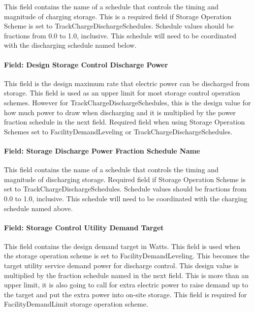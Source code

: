 This field contains the name of a schedule that controls the timing and magnitude of charging storage. This is a required field if Storage Operation Scheme is set to TrackChargeDischargeSchedules. Schedule values should be fractions from 0.0 to 1.0, inclusive. This schedule will need to be coordinated with the discharging schedule named below.

\paragraph{Field: Design Storage Control Discharge Power}\label{field-design-storage-control-discharge-power}

This field is the design maximum rate that electric power can be discharged from storage. This field is used as an upper limit for most storage control operation schemes. However for TrackChargeDischargeSchedules, this is the design value for how much power to draw when discharging and it is multiplied by the power fraction schedule in the next field. Required field when using Storage Operation Schemes set to FacilityDemandLeveling or TrackChargeDischargeSchedules.

\paragraph{Field: Storage Discharge Power Fraction Schedule Name}\label{field-storage-discharge-power-fraction-schedule-name}

This field contains the name of a schedule that controls the timing and magnitude of discharging storage. Required field if Storage Operation Scheme is set to TrackChargeDischargeSchedules. Schedule values should be fractions from 0.0 to 1.0, inclusive. This schedule will need to be coordinated with the charging schedule named above.

\paragraph{Field: Storage Control Utility Demand Target}\label{field-storage-control-utility-demand-target}

This field contains the design demand target in Watts. This field is used when the storage operation scheme is set to FacilityDemandLeveling. This becomes the target utility service demand power for discharge control. This design value is multiplied by the fraction schedule named in the next field. This is more than an upper limit, it is also going to call for extra electric power to raise demand up to the target and put the extra power into on-site storage. This field is required for FacilityDemandLimit storage operation scheme.

